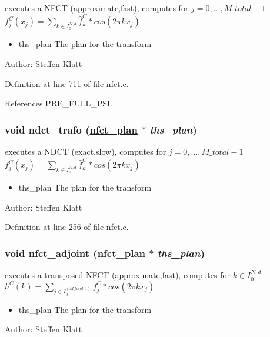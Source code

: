 executes a NFCT (approximate,fast), computes for $j=0,...,M\_total-1$ $f_j^C(x_j) = \sum_{k \in I_0^{N,d}} \hat{f}_k^C * cos(2 \pi k x_j)$ 

\begin{itemize}
\item ths\_\-plan The plan for the transform\end{itemize}
\begin{Desc}
\item[Author:]Steffen Klatt \end{Desc}


Definition at line 711 of file nfct.c.

References PRE\_\-FULL\_\-PSI.\hypertarget{group__nfsct_ga7}{
\subsubsection[ndct\_\-trafo]{\setlength{\rightskip}{0pt plus 5cm}void ndct\_\-trafo (\hyperlink{structnfct__plan}{nfct\_\-plan} $\ast$ {\em ths\_\-plan})}}
\label{group__nfsct_ga7}


executes a NDCT (exact,slow), computes for $j=0,...,M\_total-1$ $f_j^C(x_j) = \sum_{k \in I_0^{N,d}} \hat{f}_k^C * cos(2 \pi k x_j)$ 

\begin{itemize}
\item ths\_\-plan The plan for the transform\end{itemize}
\begin{Desc}
\item[Author:]Steffen Klatt \end{Desc}


Definition at line 256 of file nfct.c.\hypertarget{group__nfsct_ga8}{
\subsubsection[nfct\_\-adjoint]{\setlength{\rightskip}{0pt plus 5cm}void nfct\_\-adjoint (\hyperlink{structnfct__plan}{nfct\_\-plan} $\ast$ {\em ths\_\-plan})}}
\label{group__nfsct_ga8}


executes a transposed NFCT (approximate,fast), computes for $k \in I_0^{N,d}$ $h^C(k) = \sum_{j \in I_0^{(M\_total,1)}} f_j^C * cos(2 \pi k x_j)$ 

\begin{itemize}
\item ths\_\-plan The plan for the transform\end{itemize}
\begin{Desc}
\item[Author:]Steffen Klatt \end{Desc}


